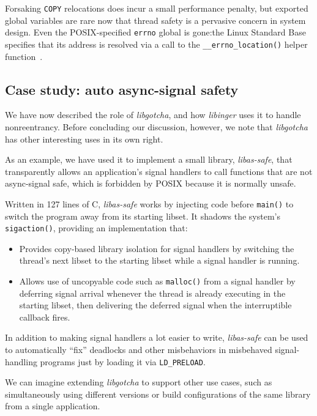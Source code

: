 Forsaking \texttt{COPY} relocations does incur a small performance penalty, but
exported global variables are rare now that thread safety is a pervasive concern in
system design.  Even the POSIX-specified \texttt{errno} global is gone:\@ the Linux
Standard Base specifies that its address is resolved via a call to the
\texttt{\_\_errno\_location()} helper function~\cite{www-lsb-errno}.


\subsection{Case study: auto async-signal safety}
\label{sec:assafe}

We have now described the role of \textit{libgotcha}, and how \textit{libinger} uses
it to handle nonreentrancy.  Before concluding our discussion, however, we note that
\textit{libgotcha} has other interesting uses in its own right.

As an example, we have used it to implement a small library, \textit{libas-safe},
that transparently allows an application's signal handlers to call functions that
are not async-signal safe, which is forbidden by POSIX because it is normally unsafe.

Written in 127 lines of C, \textit{libas-safe} works by injecting code before
\texttt{main()} to switch the program away from its starting libset.  It shadows
the system's \texttt{sigaction()}, providing an implementation that:
\begin{itemize}
\item Provides copy-based library isolation for signal handlers by switching the
	thread's next libset to the starting libset while a signal handler is running.
\item Allows use of uncopyable code such as \texttt{malloc()} from a signal
	handler by deferring signal arrival whenever the thread is already executing
	in the starting libset, then delivering the deferred signal when the
	interruptible callback fires.
\end{itemize}

In addition to making signal handlers a lot easier to write, \textit{libas-safe} can
be used to automatically ``fix'' deadlocks and other misbehaviors in misbehaved
signal-handling programs just by loading it via \texttt{LD\_PRELOAD}.

We can imagine extending \textit{libgotcha} to support other use cases, such as
simultaneously using different versions or build configurations of the same library
from a single application.

